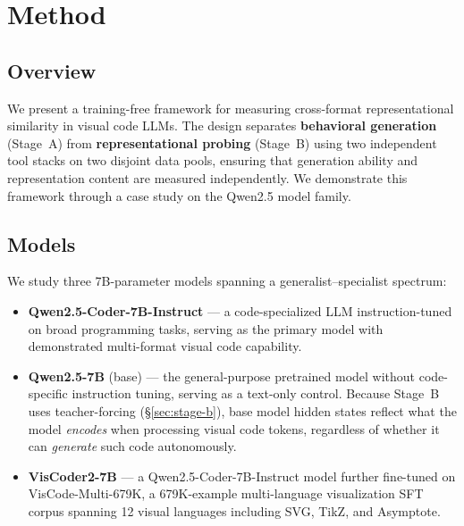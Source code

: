 
\section{Method}
\label{sec:method}

\subsection{Overview}

We present a training-free framework for measuring cross-format representational similarity in visual code LLMs.
The design separates \textbf{behavioral generation} (Stage~A) from \textbf{representational probing} (Stage~B) using two independent tool stacks on two disjoint data pools, ensuring that generation ability and representation content are measured independently.
We demonstrate this framework through a case study on the Qwen2.5 model family.

\subsection{Models}

We study three 7B-parameter models spanning a generalist--specialist spectrum:

\begin{itemize}
    \item \textbf{Qwen2.5-Coder-7B-Instruct} \cite{qwen25coder} --- a code-specialized LLM instruction-tuned on broad programming tasks, serving as the primary model with demonstrated multi-format visual code capability.

    \item \textbf{Qwen2.5-7B} (base) --- the general-purpose pretrained model without code-specific instruction tuning, serving as a text-only control.
    Because Stage~B uses teacher-forcing (\S\ref{sec:stage-b}), base model hidden states reflect what the model \emph{encodes} when processing visual code tokens, regardless of whether it can \emph{generate} such code autonomously.

    \item \textbf{VisCoder2-7B} \cite{viscoder2} --- a Qwen2.5-Coder-7B-Instruct model further fine-tuned on VisCode-Multi-679K, a 679K-example multi-language visualization SFT corpus spanning 12 visual languages including SVG, TikZ, and Asymptote.
\end{itemize}

